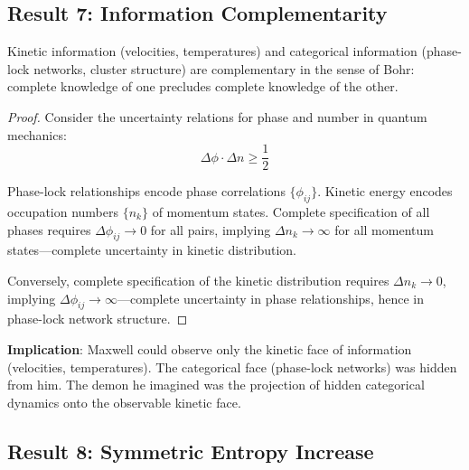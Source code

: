 \subsection{Result 7: Information Complementarity}

\begin{theorem}
\label{thm:complementarity}
Kinetic information (velocities, temperatures) and categorical information (phase-lock networks, cluster structure) are complementary in the sense of Bohr: complete knowledge of one precludes complete knowledge of the other.
\end{theorem}

\begin{proof}
Consider the uncertainty relations for phase and number in quantum mechanics:
\begin{equation}
\Delta \phi \cdot \Delta n \geq \frac{1}{2}
\end{equation}

Phase-lock relationships encode phase correlations $\{\phi_{ij}\}$. Kinetic energy encodes occupation numbers $\{n_k\}$ of momentum states. Complete specification of all phases requires $\Delta \phi_{ij} \to 0$ for all pairs, implying $\Delta n_k \to \infty$ for all momentum states---complete uncertainty in kinetic distribution.

Conversely, complete specification of the kinetic distribution requires $\Delta n_k \to 0$, implying $\Delta \phi_{ij} \to \infty$---complete uncertainty in phase relationships, hence in phase-lock network structure.
\end{proof}

\textbf{Implication}: Maxwell could observe only the kinetic face of information (velocities, temperatures). The categorical face (phase-lock networks) was hidden from him. The demon he imagined was the projection of hidden categorical dynamics onto the observable kinetic face.

\subsection{Result 8: Symmetric Entropy Increase}

